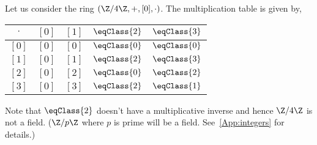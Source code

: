 \begin{Example}
    Let us consider the ring $\left(\Z/4\Z,+,[0],\cdot\right)$. The multiplication table is given by,
    \begin{tabular}{ccccc}
	\toprule
	$\cdot$    & $\left[0\right]$ & $\left[1\right]$  & $\eqClass{2}$ & $\eqClass{3}$\\
	\midrule
	$\left[0\right]$      & $\left[0\right]$    & $\left[0\right]$  &$\eqClass{0}$ &$\eqClass{0}$  \\
	$\left[1\right]$      & $\left[0\right]$    & $\left[1\right]$  &$\eqClass{2}$ &$\eqClass{3}$  \\
	$\left[2\right]$      & $\left[0\right]$    & $\left[2\right]$  &$\eqClass{0}$ &$\eqClass{2}$ \\
	$\left[3\right]$      & $\left[0\right]$    & $\left[3\right]$  &$\eqClass{2}$ &$\eqClass{1}$ \\
	\bottomrule
    \end{tabular}
    Note that $\eqClass{2}$ doesn't have a multiplicative inverse and hence $\Z/4\Z$ is not a field. 
    ($\Z/p\Z$ where $p$ is prime will be a field. See~\ref{App:integers} for details.)
\end{Example}

